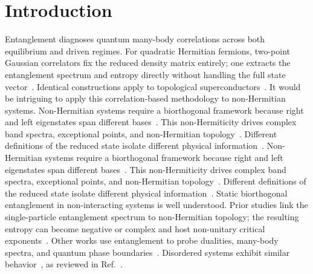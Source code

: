 \documentclass[aps,prb,reprint,superscriptaddress,amsmath,amssymb,floatfix]{revtex4-2}
\begin{document}
\maketitle

\section{Introduction}
\label{sec:introduction}

Entanglement diagnoses quantum many-body correlations across both equilibrium and driven regimes. For quadratic Hermitian fermions, two-point Gaussian correlators fix the reduced density matrix entirely; one extracts the entanglement spectrum and entropy directly without handling the full state vector~\cite{Peschel2003,PeschelEisler2009}. Identical constructions apply to topological superconductors~\cite{Fidkowski2010}.
%
It would be intriguing to apply this correlation-based methodology to non-Hermitian systems.
%
Non-Hermitian systems require a biorthogonal framework because right and left eigenstates span different bases~\cite{Brody2014}. This non-Hermiticity drives complex band spectra, exceptional points, and non-Hermitian topology~\cite{Kawabata2019,Ashida2020,Bergholtz2021}. Different definitions of the reduced state isolate different physical information~\cite{Herviou2019,Chang2020,Guo2021,Tu2022}.
%
Non-Hermitian systems require a biorthogonal framework because right and left eigenstates span different bases~\cite{Brody2014}. This non-Hermiticity drives complex band spectra, exceptional points, and non-Hermitian topology~\cite{Kawabata2019,Ashida2020,Bergholtz2021}. Different definitions of the reduced state isolate different physical information~\cite{Herviou2019,Chang2020,Guo2021,Tu2022}.
%
Static biorthogonal entanglement in non-interacting systems is well understood. Prior studies link the single-particle entanglement spectrum to non-Hermitian topology; the resulting entropy can become negative or complex and host non-unitary critical exponents~\cite{Herviou2019,Chang2020,Guo2021,Tu2022,XueLee2026}. Other works use entanglement to probe dualities, many-body spectra, and quantum phase boundaries~\cite{SciPostPhys.11.1.003,PhysRevLett.130.010401,26jz-zmsv,Agarwal2026}. Disordered systems exhibit similar behavior~\cite{Tozar2026}, as reviewed in Ref.~\cite{Chen2024Review}.
\end{document}
